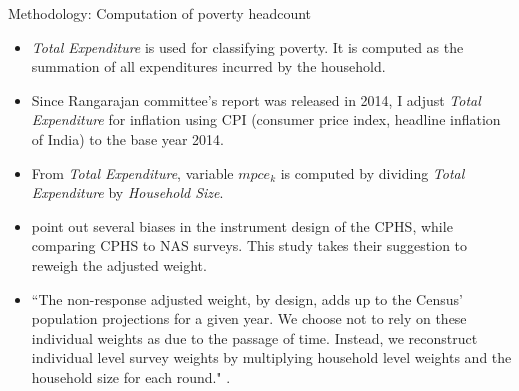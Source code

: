 \documentclass[10pt,aspectratio=169]{beamer}
\begin{document}
\begin{frame}{Methodology: Computation of poverty headcount}
    \fontsize{10pt}{12pt}\selectfont
\begin{itemize}
    \item \textit{Total Expenditure} is used for classifying poverty. It is computed as the summation of all expenditures incurred by the household.
    \item Since Rangarajan committee's report was released in 2014, I adjust \textit{Total Expenditure} for inflation using CPI (consumer price index, headline inflation of India) to the base year 2014.
    \item From \textit{Total Expenditure}, variable $mpce_k$ is computed by dividing \textit{Total Expenditure} by \textit{Household Size}.
    \end{itemize}
    \vspace{0.5cm}
    \begin{itemize}
    \item \textcite{roy2022poverty} point out several biases in the instrument design of the CPHS, while comparing CPHS to NAS surveys. This study takes their suggestion to reweigh the adjusted weight.
    \item ``The non-response adjusted weight, by design, adds up to the Census’ population projections for a given year. We choose not to rely on these individual weights as due to the passage of time. Instead, we reconstruct individual level survey weights by multiplying household level weights and the household size for each round." \parencite[11]{roy2022poverty}.
        
    \end{itemize}
\end{frame}
\end{document}
